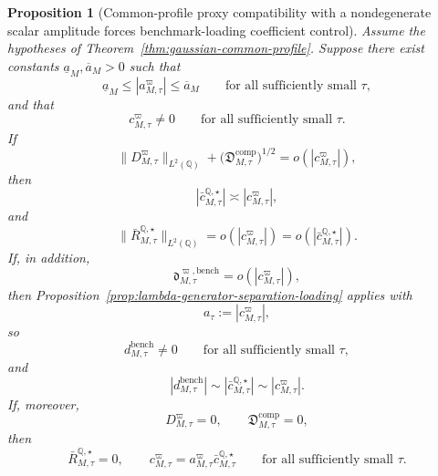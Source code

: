\documentclass[11pt,a4paper]{amsart}
\theoremstyle{plain}
\newtheorem{proposition}[theorem]{Proposition}
\theoremstyle{definition}
\theoremstyle{remark}
\newcommand{\QQ}{\mathbb{Q}}
\begin{document}
\begin{proposition}[Common-profile proxy compatibility with a nondegenerate scalar amplitude forces benchmark-loading coefficient control]\label{prop:gaussian-common-profile-loading}
Assume the hypotheses of Theorem~\ref{thm:gaussian-common-profile}.  Suppose there exist constants
\(\underline a_M,\overline a_M>0\) such that
\[
        \underline a_M
        \le
        |a_{M,\tau}^\varpi|
        \le
        \overline a_M
        \qquad
        \text{for all sufficiently small }\tau,
\]
and that
\[
        c_{M,\tau}^\varpi\neq0
        \qquad
        \text{for all sufficiently small }\tau.
\]
If
\[
        \|D_{M,\tau}^\varpi\|_{L^2(\QQ)}
        +
        \bigl(\mathfrak D_{M,\tau}^{\mathrm{comp}}\bigr)^{1/2}
        =
        o\!\left(
                |c_{M,\tau}^\varpi|
        \right),
\]
then
\[
        \left|
                \bar c_{M,\tau}^{\QQ,\star}
        \right|
        \asymp
        |c_{M,\tau}^\varpi|,
\]
and
\[
        \|\bar R_{M,\tau}^{\QQ,\star}\|_{L^2(\QQ)}
        =
        o\!\left(
                |c_{M,\tau}^\varpi|
        \right)
        =
        o\!\left(
                \left|
                        \bar c_{M,\tau}^{\QQ,\star}
                \right|
        \right).
\]
If, in addition,
\[
        \mathfrak d_{M,\tau}^{\varpi,\mathrm{bench}}
        =
        o\!\left(
                |c_{M,\tau}^\varpi|
        \right),
\]
then Proposition~\ref{prop:lambda-generator-separation-loading} applies with
\[
        a_\tau:=|c_{M,\tau}^\varpi|,
\]
so
\[
        d_{M,\tau}^{\mathrm{bench}}\neq0
        \qquad
        \text{for all sufficiently small }\tau,
\]
and
\[
        \left|
                d_{M,\tau}^{\mathrm{bench}}
        \right|
        \sim
        \left|
                \bar c_{M,\tau}^{\QQ,\star}
        \right|
        \sim
        |c_{M,\tau}^\varpi|.
\]
If, moreover,
\[
        D_{M,\tau}^\varpi=0,
        \qquad
        \mathfrak D_{M,\tau}^{\mathrm{comp}}=0,
\]
then
\[
        \bar R_{M,\tau}^{\QQ,\star}=0,
        \qquad
        c_{M,\tau}^\varpi
        =
        a_{M,\tau}^\varpi\bar c_{M,\tau}^{\QQ,\star}
        \qquad
        \text{for all sufficiently small }\tau.
\]
\end{proposition}
\end{document}
